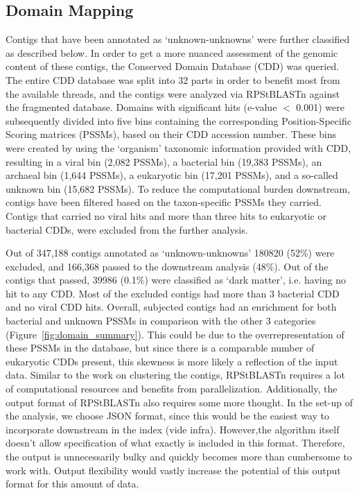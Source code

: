 \documentclass[genes, moreauthors]{Definitions/mdpi}
\begin{document}
  \subsection{Domain Mapping}
  Contigs that have been annotated as ‘unknown-unknowns’ were further
  classified as described below. In order to get a more nuanced assessment of
  the genomic content of these contigs, the Conserved Domain Database (CDD)
  \cite{Marchler-Bauer2017} was queried. The entire CDD database was split into
  32 parts in order to benefit most from the available threads, and the contigs
  were analyzed via RPStBLASTn \citep{Camacho2009} against the fragmented
  database. Domains with significant  hits (e-value $<$ 0.001) were subsequently
  divided into five bins containing the corresponding Position-Specific Scoring
  matrices (PSSMs), based on their CDD accession number. These bins were created
  by using the ‘organism’ taxonomic information provided with CDD, resulting in
  a viral bin (2,082 PSSMs), a bacterial bin (19,383 PSSMs), an archaeal bin
  (1,644 PSSMs), a eukaryotic bin (17,201 PSSMs), and a so-called unknown bin
  (15,682 PSSMs). To reduce the computational burden downstream, contigs have
  been filtered based on the taxon-specific PSSMs they carried. Contigs that
  carried no viral hits and more than three hits to eukaryotic or bacterial
  CDDs, were excluded from the  further analysis.

  Out of 347,188 contigs annotated as ‘unknown-unknowns’ 180820 (52\%) were
  excluded, and 166,368 passed to the downstream analysis (48\%). Out of the
  contigs that passed, 39986 (0.1\%) were classified as ‘dark matter’, i.e.
  having no hit to any CDD. Most of the excluded contigs had more than 3
  bacterial CDD and no viral CDD hits. Overall, subjected contigs had an
  enrichment for both bacterial and unknown PSSMs in comparison with the other
  3 categories (Figure~\ref{fig:domain_summary}). This could be due to the
  overrepresentation of these PSSMs in the
  database, but since there is a comparable number of eukaryotic CDDs present,
  this skewness is more likely a reflection of the input data. Similar to the
  work on clustering the contigs, RPStBLASTn requires a lot of computational
  resources and benefits from parallelization. Additionally, the output format
  of RPStBLASTn also requires some more thought. In the set-up of the analysis,
  we choose JSON \cite{rfc_json} format, since this would be the easiest way to
  incorporate downstream in the index (vide infra). However,the algorithm
  itself doesn’t allow specification of what exactly is included in this
  format. Therefore, the output is unnecessarily bulky and quickly becomes more
  than cumbersome to work with. Output flexibility would vastly increase the
  potential of this output format for this amount of data.
\end{document}
